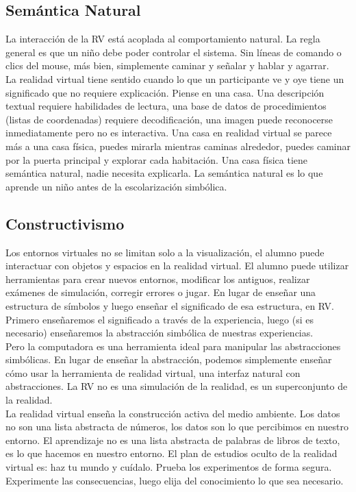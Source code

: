 \subsection{Semántica Natural}
La interacción de la RV está acoplada al comportamiento natural. La regla general es que un niño debe poder controlar el sistema. Sin líneas de comando o clics del mouse, 
más bien, simplemente caminar y señalar y hablar y agarrar.\\
La realidad virtual tiene sentido cuando lo que un participante ve y oye tiene un significado que no requiere explicación. Piense en una casa. 
Una descripción textual requiere habilidades de lectura, una base de datos de procedimientos (listas de coordenadas) requiere decodificación, una imagen puede reconocerse 
inmediatamente pero no es interactiva. Una casa en realidad virtual se parece más a una casa física, puedes mirarla mientras caminas alrededor, puedes caminar por la puerta 
principal y explorar cada habitación. Una casa física tiene semántica natural, nadie necesita explicarla. La semántica natural es lo que aprende un niño antes de la escolarización 
simbólica.

\subsection{Constructivismo}
Los entornos virtuales no se limitan solo a la visualización, el alumno puede interactuar con objetos y espacios en la realidad virtual. El alumno puede utilizar herramientas para crear 
nuevos entornos, modificar los antiguos, realizar exámenes de simulación, corregir errores o jugar. En lugar de enseñar una estructura de símbolos y luego enseñar el significado de esa 
estructura, en RV. Primero enseñaremos el significado a través de la experiencia, luego (si es necesario) enseñaremos la abstracción simbólica de nuestras experiencias.\\
Pero la computadora es una herramienta ideal para manipular las abstracciones simbólicas. En lugar de enseñar la abstracción, podemos simplemente enseñar cómo usar la herramienta 
de realidad virtual, una interfaz natural con abstracciones. La RV no es una simulación de la realidad, es un superconjunto de la realidad.\\
La realidad virtual enseña la construcción activa del medio ambiente. Los datos no son una lista abstracta de números, los datos son lo que percibimos en nuestro entorno. 
El aprendizaje no es una lista abstracta de palabras de libros de texto, es lo que hacemos en nuestro entorno. El plan de estudios oculto de la realidad virtual es: haz tu mundo y 
cuídalo. Prueba los experimentos de forma segura. Experimente las consecuencias, luego elija del conocimiento lo que sea necesario.

